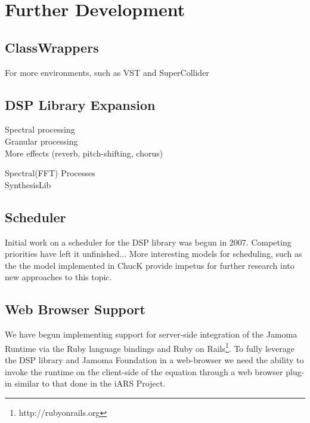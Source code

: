 \documentclass[twoside,10pt]{article}
\begin{document}


\section{Further Development} %


\subsection{ClassWrappers}

For more environments, such as VST and SuperCollider

\subsection{DSP Library Expansion}

Spectral processing \\

Granular processing   \\

More effects (reverb, pitch-shifting, chorus) 


Spectral(FFT) Processes\\

SynthesisLib

\subsection{Scheduler}

Initial work on a scheduler for the DSP library was begun in 2007.  Competing priorities have left it unfinished...  More interesting models for scheduling, such as the the model implemented in ChucK provide impetus for further research into new approaches to this topic.


\subsection{Web Browser Support}
We have begun implementing support for server-side integration of the Jamoma Runtime via the Ruby language bindings and Ruby on Rails\footnote{http://rubyonrails.org}.  To fully leverage the DSP library and Jamoma Foundation in a web-browser we need the ability to invoke the runtime on the client-side of the equation through a web browser plug-in similar to that done in the iARS Project\cite{Frauenberger:2003}.
\end{document}
